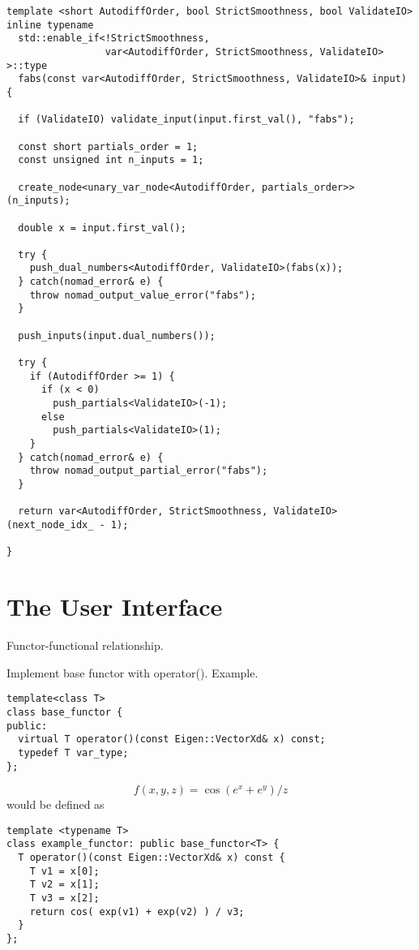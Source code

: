 \begin{verbatim}
template <short AutodiffOrder, bool StrictSmoothness, bool ValidateIO>
inline typename 
  std::enable_if<!StrictSmoothness, 
                 var<AutodiffOrder, StrictSmoothness, ValidateIO> >::type
  fabs(const var<AutodiffOrder, StrictSmoothness, ValidateIO>& input) {
    
  if (ValidateIO) validate_input(input.first_val(), "fabs");
      
  const short partials_order = 1;
  const unsigned int n_inputs = 1;
    
  create_node<unary_var_node<AutodiffOrder, partials_order>>(n_inputs);

  double x = input.first_val();
    
  try {
    push_dual_numbers<AutodiffOrder, ValidateIO>(fabs(x));
  } catch(nomad_error& e) {
    throw nomad_output_value_error("fabs");
  }
      
  push_inputs(input.dual_numbers());
    
  try {
    if (AutodiffOrder >= 1) {
      if (x < 0)
        push_partials<ValidateIO>(-1);
      else
        push_partials<ValidateIO>(1);
    }
  } catch(nomad_error& e) {
    throw nomad_output_partial_error("fabs");
  }

  return var<AutodiffOrder, StrictSmoothness, ValidateIO>(next_node_idx_ - 1);
    
}
\end{verbatim}

\section{The \nomad User Interface}
\label{sec:user_interface}

Functor-functional relationship.

Implement base functor with operator().  Example.

\begin{verbatim}
template<class T>
class base_functor {
public:
  virtual T operator()(const Eigen::VectorXd& x) const;
  typedef T var_type;
};
\end{verbatim}

\begin{equation*}
f \! \left( x, y, z \right) = \cos \! \left( e^{x} + e^{y} \right) / z
\end{equation*}
%
would be defined as
%
\begin{verbatim}
template <typename T>
class example_functor: public base_functor<T> {
  T operator()(const Eigen::VectorXd& x) const {
    T v1 = x[0];
    T v2 = x[1];
    T v3 = x[2];
    return cos( exp(v1) + exp(v2) ) / v3;  
  }
};
\end{verbatim}

